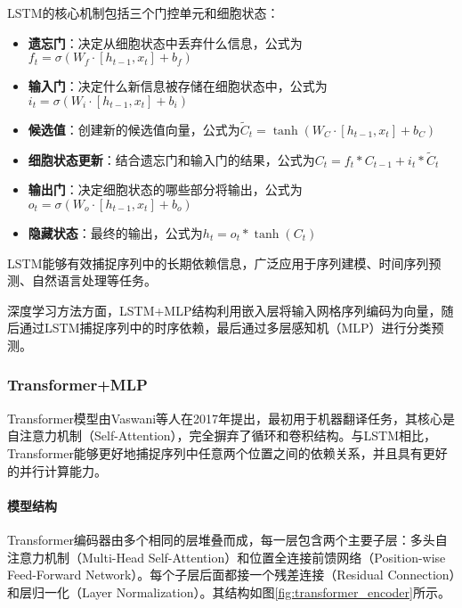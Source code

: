 \documentclass{article}
\begin{document}
LSTM的核心机制包括三个门控单元和细胞状态：

\begin{itemize}
\item \textbf{遗忘门}：决定从细胞状态中丢弃什么信息，公式为$f_t = \sigma(W_f \cdot [h_{t-1}, x_t] + b_f)$
\item \textbf{输入门}：决定什么新信息被存储在细胞状态中，公式为$i_t = \sigma(W_i \cdot [h_{t-1}, x_t] + b_i)$
\item \textbf{候选值}：创建新的候选值向量，公式为$\tilde{C}_t = \tanh(W_C \cdot [h_{t-1}, x_t] + b_C)$
\item \textbf{细胞状态更新}：结合遗忘门和输入门的结果，公式为$C_t = f_t * C_{t-1} + i_t * \tilde{C}_t$
\item \textbf{输出门}：决定细胞状态的哪些部分将输出，公式为$o_t = \sigma(W_o \cdot [h_{t-1}, x_t] + b_o)$
\item \textbf{隐藏状态}：最终的输出，公式为$h_t = o_t * \tanh(C_t)$
\end{itemize}

LSTM能够有效捕捉序列中的长期依赖信息，广泛应用于序列建模、时间序列预测、自然语言处理等任务。

深度学习方法方面，LSTM+MLP结构利用嵌入层将输入网格序列编码为向量，随后通过LSTM捕捉序列中的时序依赖\cite{hochreiter_long_1997}，最后通过多层感知机（MLP）进行分类预测。

\subsubsection{Transformer+MLP}

Transformer模型由Vaswani等人在2017年提出，最初用于机器翻译任务，其核心是自注意力机制（Self-Attention），完全摒弃了循环和卷积结构\cite{vaswani_attention_2023}。与LSTM相比，Transformer能够更好地捕捉序列中任意两个位置之间的依赖关系，并且具有更好的并行计算能力。

\paragraph{模型结构}
Transformer编码器由多个相同的层堆叠而成，每一层包含两个主要子层：多头自注意力机制（Multi-Head Self-Attention）和位置全连接前馈网络（Position-wise Feed-Forward Network）。每个子层后面都接一个残差连接（Residual Connection）和层归一化（Layer Normalization）。其结构如图\ref{fig:transformer_encoder}所示。
\end{document}
